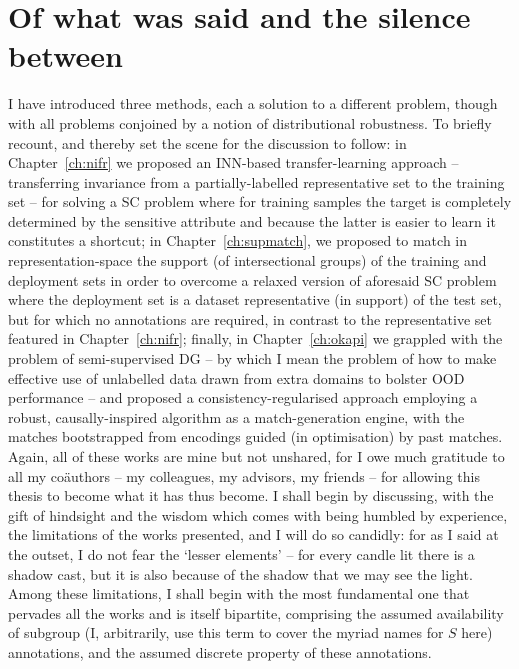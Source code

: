 \section*{Of what was said and the silence between}\label{sec:what-was-said}
%
I have introduced three methods, each a solution to a different problem, though with all problems
conjoined by a notion of distributional robustness.
%
%
To briefly recount, and thereby set the scene for the discussion to follow: in
Chapter~\ref{ch:nifr} we proposed an \ac{INN}-based transfer-learning approach -- transferring
invariance from a partially-labelled representative set to the training set -- for solving a
\ac{SC} problem where for training samples the target is completely determined by the
sensitive attribute and because the latter is easier to learn it constitutes a shortcut;
%
in Chapter~\ref{ch:supmatch}, we proposed to match in representation-space the support (of
intersectional groups) of the training and deployment sets in order to overcome a relaxed version
of aforesaid \ac{SC} problem where the deployment set is a dataset representative (in support) of
the test set, but for which no annotations are required, in contrast to the representative set
featured in Chapter~\ref{ch:nifr};
%
finally, in Chapter~\ref{ch:okapi} we grappled with the problem of semi-supervised \ac{DG} -- by
which I mean the problem of how to make effective use of unlabelled data drawn from extra domains
to bolster \ac{OOD} performance -- and proposed a consistency-regularised approach employing a
robust, causally-inspired algorithm as a match-generation engine, with the matches bootstrapped
from encodings guided (in optimisation) by past matches.
%
Again, all of these works are mine but not unshared, for I owe much gratitude to all my
co{\"a}uthors -- my colleagues, my advisors, my friends -- for allowing this thesis to become what
it has thus become.
%
%
I shall begin by discussing, with the gift of hindsight and the wisdom which comes with being
humbled by experience, the limitations of the works presented, and I will do so candidly: for as I
said at the outset, I do not fear the `lesser elements' -- for every candle lit there is a shadow
cast, but it is also because of the shadow that we may see the light.
%
Among these limitations, I shall begin with the most fundamental one that pervades all the works
and is itself bipartite, comprising the assumed availability of subgroup (I, arbitrarily, use this
term to cover the myriad names for \(S\) here) annotations, and the assumed discrete property of
these annotations.

